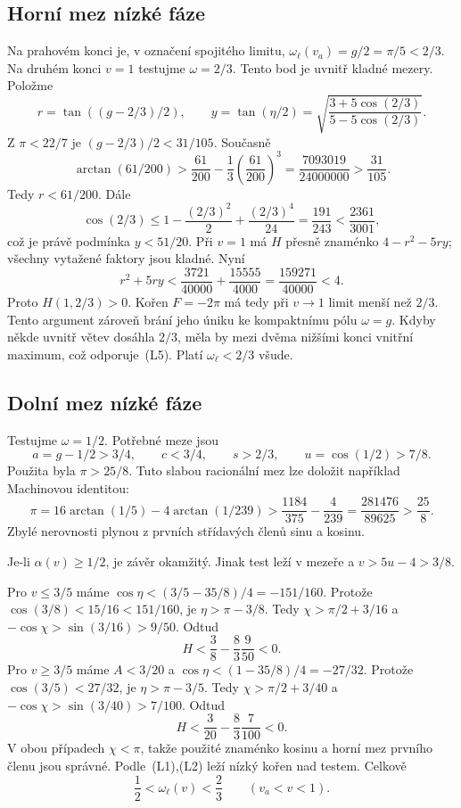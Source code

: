 \documentclass[11pt,a4paper]{article}
\theoremstyle{remark}\newtheorem{remark}[theorem]{Poznámka}
\numberwithin{equation}{section}
\begin{document}
\subsection{Horní mez nízké fáze}

Na prahovém konci je, v označení spojitého limitu,
\(\omega_\ell(v_a)=g/2=\pi/5<2/3\). Na druhém konci
\(v=1\) testujme \(\omega=2/3\). Tento bod je uvnitř
kladné mezery. Položme
\[
r=\tan((g-2/3)/2),\qquad
y=\tan(\eta/2)
=\sqrt{\frac{3+5\cos(2/3)}{5-5\cos(2/3)}}.
\]
Z \(\pi<22/7\) je \((g-2/3)/2<31/105\). Současně
\[
\arctan(61/200)>\frac{61}{200}
-\frac13\left(\frac{61}{200}\right)^3
=\frac{7093019}{24000000}>\frac{31}{105}.
\]
Tedy \(r<61/200\). Dále
\[
\cos(2/3)\le1-\frac{(2/3)^2}{2}+\frac{(2/3)^4}{24}
=\frac{191}{243}<\frac{2361}{3001},
\]
což je právě podmínka \(y<51/20\). Při \(v=1\) má \(H\)
přesně znaménko \(4-r^2-5ry\); všechny vytažené faktory jsou
kladné. Nyní
\[
r^2+5ry<\frac{3721}{40000}+\frac{15555}{4000}
=\frac{159271}{40000}<4.
\tag{L6}
\]
Proto \(H(1,2/3)>0\). Kořen \(F=-2\pi\) má tedy při
\(v\to1\) limit menší než \(2/3\). Tento argument zároveň
brání jeho úniku ke kompaktnímu pólu \(\omega=g\). Kdyby
někde uvnitř větev dosáhla \(2/3\), měla by mezi dvěma nižšími
konci vnitřní maximum, což odporuje~(L5). Platí
\(\omega_\ell<2/3\) všude.

\subsection{Dolní mez nízké fáze}

Testujme \(\omega=1/2\). Potřebné meze jsou
\[
a=g-1/2>3/4,\qquad c<3/4,\qquad s>2/3,
\qquad u=\cos(1/2)>7/8.
\tag{L7}
\]
Použita byla \(\pi>25/8\). Tuto slabou racionální mez lze
doložit například Machinovou identitou:
\[
\pi=16\arctan(1/5)-4\arctan(1/239)
>\frac{1184}{375}-\frac4{239}
=\frac{281476}{89625}>\frac{25}{8}.
\]
Zbylé nerovnosti plynou z prvních střídavých členů sinu a kosinu.

Je-li \(\alpha(v)\ge1/2\), je závěr okamžitý. Jinak test
leží v mezeře a \(v>5u-4>3/8\).

Pro \(v\le3/5\) máme
\(\cos\eta<(3/5-35/8)/4=-151/160\). Protože
\(\cos(3/8)<15/16<151/160\), je \(\eta>\pi-3/8\).
Tedy \(\chi>\pi/2+3/16\) a
\(-\cos\chi>\sin(3/16)>9/50\). Odtud
\[
H<\frac38-\frac83\frac9{50}<0.
\]
Pro \(v\ge3/5\) máme \(A<3/20\) a
\(\cos\eta<(1-35/8)/4=-27/32\). Protože
\(\cos(3/5)<27/32\), je \(\eta>\pi-3/5\). Tedy
\(\chi>\pi/2+3/40\) a
\(-\cos\chi>\sin(3/40)>7/100\). Odtud
\[
H<\frac3{20}-\frac83\frac7{100}<0.
\]
V obou případech \(\chi<\pi\), takže použité znaménko kosinu
a horní mez prvního členu jsou správné. Podle~(L1),(L2) leží
nízký kořen nad testem. Celkově
\[
\boxed{\frac12<\omega_\ell(v)<\frac23\qquad(v_a<v<1).}
\tag{L8}
\]
\end{document}
